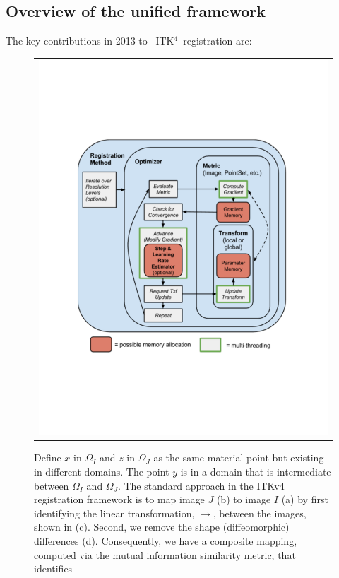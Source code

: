 \documentclass{frontiersSCNS}
\newcommand{\tk}{~ITK$^{\text{4}}$~}
\begin{document}
\subsection{Overview of the unified framework}
The key contributions in 2013 to \tk registration are:
\begin{figure}[t]
\begin{center}
\begin{tabular}{c}
\includegraphics[width=5in]{figs/software_design.pdf}
\end{tabular}
\caption{\baselineskip 12pt \small Define $x$ in $\Omega_I$ and $z$ in
  $\Omega_J$ as the same material point but existing in different
  domains.  The point $y$ is in a domain that is intermediate between
  $\Omega_I$ and $\Omega_J$.  The standard approach in the ITKv4
  registration framework is to map image $J$ (b) to image $I$ (a) by first
  identifying the linear transformation, $\rightarrow$, between the images, shown in (c).  Second, we remove the shape (diffeomorphic)
  differences (d).  Consequently, we have a composite mapping, computed via the
  mutual information similarity metric, that identifies
}
\end{center}
\end{figure}
\end{document}
